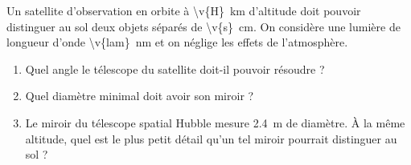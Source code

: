 Un satellite d'observation en orbite à \qty{\v{H}}{km} d'altitude doit pouvoir distinguer au sol deux objets séparés de \qty{\v{s}}{cm}. On considère une lumière de longueur d'onde \qty{\v{lam}}{nm} et on néglige les effets de l'atmosphère.

\begin{enumerate}[label=\alph*)]
    \item Quel angle le télescope du satellite doit-il pouvoir résoudre ?
    \item Quel diamètre minimal doit avoir son miroir ?
    \item Le miroir du télescope spatial Hubble mesure \qty{2.4}{m} de diamètre. À la même altitude, quel est le plus petit détail qu'un tel miroir pourrait distinguer au sol ?
\end{enumerate}

